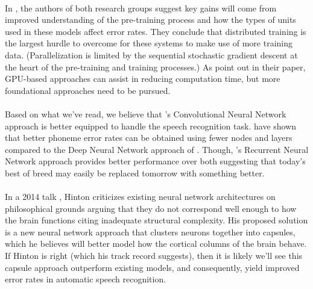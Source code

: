 \documentclass[letterpaper]{article}
\begin{document}
\paragraph{} In \cite{DBLP:journals/spm/X12a}, the authors of both research groups suggest key gains will come from improved understanding of the pre-training process and how the types of units used in these models affect error rates. They conclude that distributed training is the largest hurdle to overcome for these systems to make use of more training data. (Parallelization is limited by the sequential stochastic gradient descent at the heart of the pre-training and training processes.) As \cite{DBLP:journals/taslp/DahlYDA12} point out in their paper, GPU-based approaches can assist in reducing computation time, but more foundational approaches need to be pursued. 

\paragraph{} Based on what we've read, we believe that \cite{DBLP:journals/taslp/Abdel-HamidMJDPY14}'s Convolutional Neural Network approach is better equipped to handle the speech recognition task. \cite{DBLP:journals/taslp/Abdel-HamidMJDPY14} have shown that better phoneme error rates can be obtained using fewer nodes and layers compared to the Deep Neural Network approach of \cite{DBLP:journals/taslp/DahlYDA12}. Though, \cite{DBLP:conf/icassp/GravesMH13}'s Recurrent Neural Network approach provides better performance over both suggesting that today's best of breed may easily be replaced tomorrow with something better.

\paragraph{} In a 2014 talk \cite{self:hinton14}, Hinton criticizes existing neural network architectures on philosophical grounds arguing that they do not correspond well enough to how the brain functions citing inadequate structural complexity. His proposed solution is a new neural network approach that clusters neurons together into capsules, which he believes will better model how the cortical columns of the brain behave. If Hinton is right (which his track record suggests), then it is likely we'll see this capsule approach outperform existing models, and consequently, yield improved error rates in automatic speech recognition.




\appendix

\singlespacing



\end{document}
